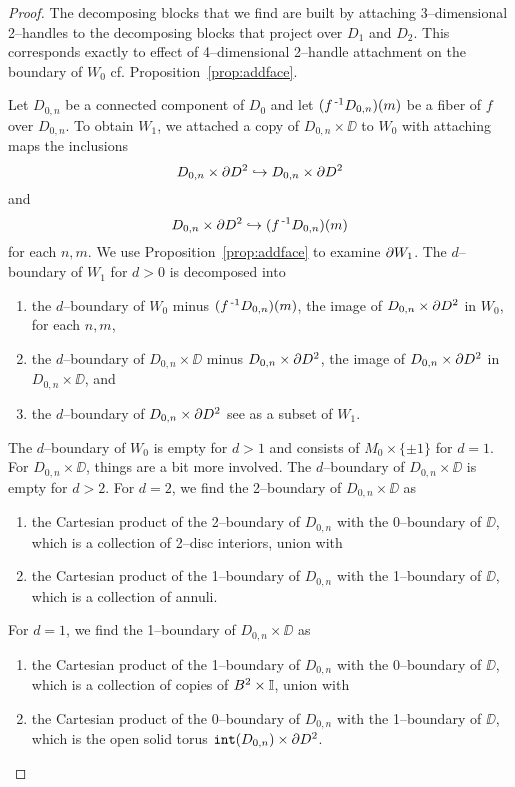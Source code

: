 \begin{proof}
	The decomposing blocks that we find are built by attaching 3--dimensional 2--handles to the decomposing blocks that project over $D_1$ and $D_2$.
	This corresponds exactly to effect of 4--dimensional 2--handle attachment on the boundary of $W_0$ cf. Proposition~\ref{prop:addface}.
	
	Let $D_{0,n}$ be a connected component of $D_0$ and let $(f^{\,\text{-}1} D_{0,n})(m)$ be a fiber of $f$ over $D_{0,n}$.
	To obtain $W_1$, we attached a copy of $D_{0,n}\times\DD$ to $W_0$ with attaching maps the inclusions
	$$D_{0,n}\times \partial D^2 \hookrightarrow D_{0,n}\times \partial D^2$$
	and
	$$D_{0,n}\times \partial D^2 \hookrightarrow (f^{\,\text{-}1} D_{0,n})(m)$$
	for each $n,m$.
	We use Proposition~\ref{prop:addface} to examine $\partial W_1$.
	The $d$--boundary of $W_1$ for $d>0$ is decomposed into
	\begin{enumerate}
		\item
			the $d$--boundary of $W_0$ minus $(f^{\,\text{-}1} D_{0,n})(m)$, the image of $D_{0,n}\times \partial D^2$ in $W_0$, for each $n,m$,
		\item
			the $d$--boundary of $D_{0,n}\times\DD$ minus $D_{0,n}\times \partial D^2$, the image of $D_{0,n}\times \partial D^2$ in $D_{0,n}\times\DD$, and
		\item
			the $d$--boundary of $D_{0,n}\times \partial D^2$ see as a subset of $W_1$.
	\end{enumerate}
	The $d$--boundary of $W_0$ is empty for $d>1$ and consists of $M_0\times\{\pm 1\}$ for $d=1$.
	For $D_{0,n}\times\DD$, things are a bit more involved.
	The $d$--boundary of $D_{0,n}\times\DD$ is empty for $d>2$.
	For $d=2$, we find the 2--boundary of $D_{0,n}\times\DD$ as
	\begin{enumerate}
		\item
			the Cartesian product of the 2--boundary of $D_{0,n}$ with the 0--boundary of $\DD$, which is a collection of 2--disc interiors, union with		
		\item
			the Cartesian product of the 1--boundary of $D_{0,n}$ with the 1--boundary of $\DD$, which is a collection of annuli.			
	\end{enumerate}
	For $d=1$, we find the 1--boundary of $D_{0,n}\times\DD$ as
	\begin{enumerate}
		\item
		the Cartesian product of the 1--boundary of $D_{0,n}$ with the 0--boundary of $\DD$, which is a collection of copies of $B^2\times\mathbb{I}$, union with		
		\item
		the Cartesian product of the 0--boundary of $D_{0,n}$ with the 1--boundary of $\DD$, which is the open solid torus $\mathtt{int}(D_{0,n})\times\partial D^2$.			
	\end{enumerate}


\end{proof}

